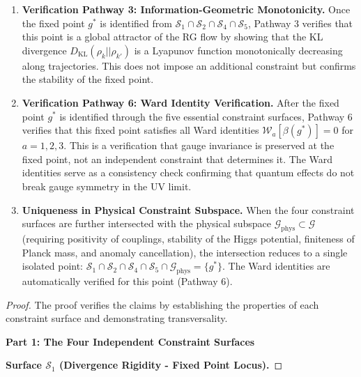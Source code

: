 \begin{theorem}
\begin{enumerate}
\item \textbf{Verification Pathway 3: Information-Geometric Monotonicity.} Once the fixed point $g^*$ is identified from $\mathcal{S}_1 \cap \mathcal{S}_2 \cap \mathcal{S}_4 \cap \mathcal{S}_5$, Pathway 3 verifies that this point is a global attractor of the RG flow by showing that the KL divergence $D_{\text{KL}}(\rho_k || \rho_{k'})$ is a Lyapunov function monotonically decreasing along trajectories. This does not impose an additional constraint but confirms the stability of the fixed point.

\item \textbf{Verification Pathway 6: Ward Identity Verification.} After the fixed point $g^*$ is identified through the five essential constraint surfaces, Pathway 6 verifies that this fixed point satisfies all Ward identities $\mathcal{W}_a[\beta(g^*)] = 0$ for $a = 1, 2, 3$. This is a verification that gauge invariance is preserved at the fixed point, not an independent constraint that determines it. The Ward identities serve as a consistency check confirming that quantum effects do not break gauge symmetry in the UV limit.

\item \textbf{Uniqueness in Physical Constraint Subspace.} When the four constraint surfaces are further intersected with the physical subspace $\mathcal{G}_{\text{phys}} \subset \mathcal{G}$ (requiring positivity of couplings, stability of the Higgs potential, finiteness of Planck mass, and anomaly cancellation), the intersection reduces to a single isolated point: $\mathcal{S}_1 \cap \mathcal{S}_2 \cap \mathcal{S}_4 \cap \mathcal{S}_5 \cap \mathcal{G}_{\text{phys}} = \{g^*\}$. The Ward identities are automatically verified for this point (Pathway 6).

\end{enumerate}

\begin{proof}

The proof verifies the claims by establishing the properties of each constraint surface and demonstrating transversality.

\textbf{Part 1: The Four Independent Constraint Surfaces}

\textbf{Surface $\mathcal{S}_1$ (Divergence Rigidity - Fixed Point Locus).}


\end{proof}
\end{theorem}
